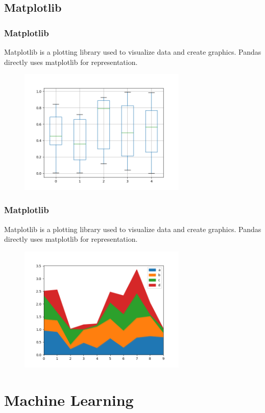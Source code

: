 \documentclass{beamer}
\begin{document}
\subsection{Matplotlib}
\begin{frame}
  \frametitle{Matplotlib}
  Matplotlib is a plotting library used to visualize data and create graphics.
  Pandas directly uses matplotlib for representation.
  \begin{figure}[h]
    \includegraphics[width=8cm]{img/boxplot.png}
  \end{figure}
\end{frame}

\begin{frame}
  \frametitle{Matplotlib}
  Matplotlib is a plotting library used to visualize data and create graphics.
  Pandas directly uses matplotlib for representation.
  \begin{figure}[h]
    \includegraphics[width=8cm]{img/area.png}
  \end{figure}
\end{frame}



\section{Machine Learning}
\end{document}
